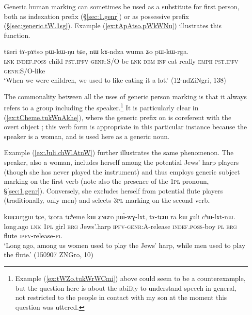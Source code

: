 Generic human marking can sometimes be used as a substitute for first person, both as indexation prefix (§\ref{sec:1.genr}) or as possessive prefix (§\ref{sec:generic.tW.1sg}). Example (\ref{ex:tApAtso.pWkWNu}) illustrates this function.

\begin{exe}
\ex   \label{ex:tApAtso.pWkWNu}
 \gll   tɕeri tɤ-pɤtso pɯ-kɯ-ŋu tɕe, nɯ kɤ-ndza wuma ʑo pɯ-kɯ-rga. \\
\textsc{lnk} \textsc{indef}.\textsc{poss}-child \textsc{pst}.\textsc{ipfv}-\textsc{genr}:S/O-be \textsc{lnk} \textsc{dem} \textsc{inf}-eat really \textsc{emph} \textsc{pst}.\textsc{ipfv}-\textsc{genr}:S/O-like \\
\glt `When we were children, we used to like eating it a lot.' (12-ndZiNgri, 138)
\end{exe}

The commonality between all the uses of generic person marking is that it always refers to a group including the speaker.\footnote{Example (\ref{ex:tWZo.tukWrWCmi}) above could seem to be a counterexample, but the question here is about the ability to understand speech in general, not restricted to the people in contact with my son at the moment this question was uttered. } It is particularly clear in (\ref{ex:tCheme.tukWnAkhe}), where the generic prefix  on   is coreferent with the overt object ; this verb form is appropriate in this particular instance because the speaker is a woman, and  is used here as a generic noun.

Example (\ref{ex:Juli.chWlAtnW}) further illustrates the same phenomenon. The speaker, also a woman, includes herself among the potential Jews' harp players (though she has never played the instrument) and thus employs generic subject marking on the first verb (note also the presence of the \textsc{1pl} pronoun, §\ref{sec:1.genr}). Conversely, she excludes herself from potential flute players (traditionally, only men) and selects \textsc{3pl} marking on the second verb. 

\begin{exe}
\ex \label{ex:Juli.chWlAtnW}
\gll kɯɕɯŋgɯ tɕe, iʑora tɕʰeme kɯ ʑɴɢro ɲɯ́-wɣ-lɤt, tɤ-tɕɯ ra kɯ ɟuli cʰɯ-lɤt-nɯ. \\
 long.ago \textsc{lnk} \textsc{1pl} girl  \textsc{erg} Jews'.harp \textsc{ipfv}-\textsc{genr}:\textsc{A}-release \textsc{indef}.\textsc{poss}-boy \textsc{pl} \textsc{erg} flute \textsc{ipfv}-release-\textsc{pl}  \\
 \glt `Long ago, among us women used to play the Jews' harp, while men used to play the flute.' (150907 ZNGro, 10)
\end{exe}
 
